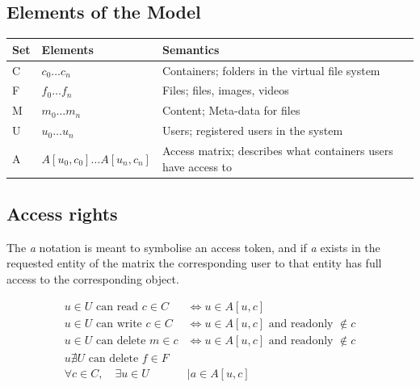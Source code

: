 \documentclass[a4paper,12pt]{article}
\newcommand{\Iff}{\Leftrightarrow}
\begin{document}
\subsection{Elements of the Model}
\begin{center}
    \begin{tabular}{ | l | l | l | p{5cm} |}
        \hline
        \textbf{Set} & \textbf{Elements} & \textbf{Semantics} \\ \hline
        C   & $c_0\dots c_n$                & Containers; folders in the virtual file system\\ \hline
        F   & $f_0\dots f_n$                & Files; files, images, videos\\ \hline
        M   & $m_0\dots m_n$                & Content; Meta-data for files\\ \hline
        U   & $u_0\dots u_n$                & Users; registered users in the system\\ \hline
        A   & $A[u_0,c_0]\dots A[u_n, c_n]$ & Access matrix; describes what containers users have access to\\ \hline
    \end{tabular}
\end{center}


\subsection{Access rights}
The \textit{a} notation is meant to symbolise an access token, and if \textit{a} exists in the requested entity of
the matrix the corresponding user to that entity has full access to the corresponding object.

\begin{equation}
    \begin{split}
        u \in U \text{ can read } c \in C & \Iff u \in A[u,c] \\
        u \in U \text{ can write } c \in C & \Iff u \in A[u,c] \text{ and readonly } \notin c \\
        u \in U \text{ can delete } m \in c & \Iff u \in A[u,c] \text{ and readonly } \notin c \\
        u \nexists U \text{ can delete } f \in F \\
        \forall c \in C, \quad \exists u \in U & \mid a \in A[u,c] 
    \end{split}
\end{equation}

\end{document}
